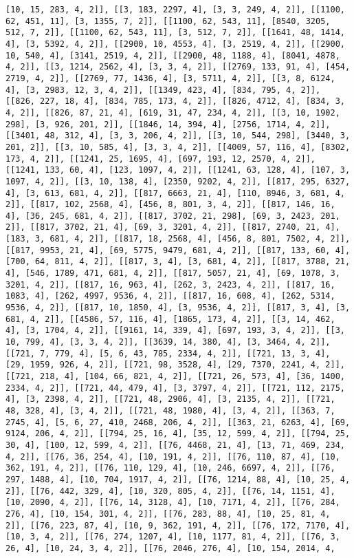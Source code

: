 \documentclass[12pt,fleqn]{article}\usepackage{../../common}
\begin{document}
\begin{verbatim}
[10, 15, 283, 4, 2]], [[3, 183, 2297, 4], [3, 3, 249, 4, 2]], [[1100, 62, 451, 11], [3, 1355, 7, 2]], [[1100, 62, 543, 11], [8540, 3205, 512, 7, 2]], [[1100, 62, 543, 11], [3, 512, 7, 2]], [[1641, 48, 1414, 4], [3, 5392, 4, 2]], [[2900, 10, 4553, 4], [3, 2519, 4, 2]], [[2900, 10, 540, 4], [3141, 2519, 4, 2]], [[2900, 48, 1188, 4], [8041, 4878, 4, 2]], [[3, 1214, 2562, 4], [3, 3, 4, 2]], [[2769, 133, 91, 4], [454, 2719, 4, 2]], [[2769, 77, 1436, 4], [3, 5711, 4, 2]], [[3, 8, 6124, 4], [3, 2983, 12, 3, 4, 2]], [[1349, 423, 4], [834, 795, 4, 2]], [[826, 227, 18, 4], [834, 785, 173, 4, 2]], [[826, 4712, 4], [834, 3, 4, 2]], [[826, 87, 21, 4], [619, 31, 47, 234, 4, 2]], [[3, 10, 1902, 298], [3, 926, 201, 2]], [[1846, 14, 394, 4], [2756, 1714, 4, 2]], [[3401, 48, 312, 4], [3, 3, 206, 4, 2]], [[3, 10, 544, 298], [3440, 3, 201, 2]], [[3, 10, 585, 4], [3, 3, 4, 2]], [[4009, 57, 116, 4], [8302, 173, 4, 2]], [[1241, 25, 1695, 4], [697, 193, 12, 2570, 4, 2]], [[1241, 133, 60, 4], [123, 1097, 4, 2]], [[1241, 63, 128, 4], [107, 3, 1097, 4, 2]], [[3, 10, 138, 4], [2350, 9202, 4, 2]], [[817, 295, 6327, 4], [3, 613, 681, 4, 2]], [[817, 6663, 21, 4], [110, 8946, 3, 681, 4, 2]], [[817, 102, 2568, 4], [456, 8, 801, 3, 4, 2]], [[817, 146, 16, 4], [36, 245, 681, 4, 2]], [[817, 3702, 21, 298], [69, 3, 2423, 201, 2]], [[817, 3702, 21, 4], [69, 3, 3201, 4, 2]], [[817, 2740, 21, 4], [183, 3, 681, 4, 2]], [[817, 18, 2568, 4], [456, 8, 801, 7502, 4, 2]], [[817, 9953, 21, 4], [69, 5775, 9479, 681, 4, 2]], [[817, 133, 60, 4], [700, 64, 811, 4, 2]], [[817, 3, 4], [3, 681, 4, 2]], [[817, 3788, 21, 4], [546, 1789, 471, 681, 4, 2]], [[817, 5057, 21, 4], [69, 1078, 3, 3201, 4, 2]], [[817, 16, 963, 4], [262, 3, 2423, 4, 2]], [[817, 16, 1083, 4], [262, 4997, 9536, 4, 2]], [[817, 16, 608, 4], [262, 5314, 9536, 4, 2]], [[817, 10, 1850, 4], [3, 9536, 4, 2]], [[817, 3, 4], [3, 681, 4, 2]], [[4586, 57, 116, 4], [1865, 173, 4, 2]], [[3, 14, 462, 4], [3, 1704, 4, 2]], [[9161, 14, 339, 4], [697, 193, 3, 4, 2]], [[3, 10, 799, 4], [3, 3, 4, 2]], [[3639, 14, 380, 4], [3, 3464, 4, 2]], [[721, 7, 779, 4], [5, 6, 43, 785, 2334, 4, 2]], [[721, 13, 3, 4], [29, 1959, 926, 4, 2]], [[721, 98, 3528, 4], [29, 7370, 2241, 4, 2]], [[721, 218, 4], [104, 66, 821, 4, 2]], [[721, 26, 573, 4], [36, 1400, 2334, 4, 2]], [[721, 44, 479, 4], [3, 3797, 4, 2]], [[721, 112, 2175, 4], [3, 2398, 4, 2]], [[721, 48, 2906, 4], [3, 2135, 4, 2]], [[721, 48, 328, 4], [3, 4, 2]], [[721, 48, 1980, 4], [3, 4, 2]], [[363, 7, 2745, 4], [5, 6, 27, 410, 2468, 206, 4, 2]], [[363, 21, 6263, 4], [69, 9124, 206, 4, 2]], [[794, 25, 16, 4], [35, 12, 599, 4, 2]], [[794, 25, 30, 4], [100, 12, 599, 4, 2]], [[76, 4468, 21, 4], [13, 71, 469, 234, 4, 2]], [[76, 36, 254, 4], [10, 191, 4, 2]], [[76, 110, 87, 4], [10, 362, 191, 4, 2]], [[76, 110, 129, 4], [10, 246, 6697, 4, 2]], [[76, 297, 1488, 4], [10, 704, 1917, 4, 2]], [[76, 1214, 88, 4], [10, 25, 4, 2]], [[76, 442, 329, 4], [10, 320, 805, 4, 2]], [[76, 14, 1151, 4], [10, 2090, 4, 2]], [[76, 14, 3128, 4], [10, 7171, 4, 2]], [[76, 284, 276, 4], [10, 154, 301, 4, 2]], [[76, 283, 88, 4], [10, 25, 81, 4, 2]], [[76, 223, 87, 4], [10, 9, 362, 191, 4, 2]], [[76, 172, 7170, 4], [10, 3, 4, 2]], [[76, 274, 1207, 4], [10, 1177, 81, 4, 2]], [[76, 3, 26, 4], [10, 24, 3, 4, 2]], [[76, 2046, 276, 4], [10, 154, 2014, 4, 
\end{verbatim}
\end{document}
